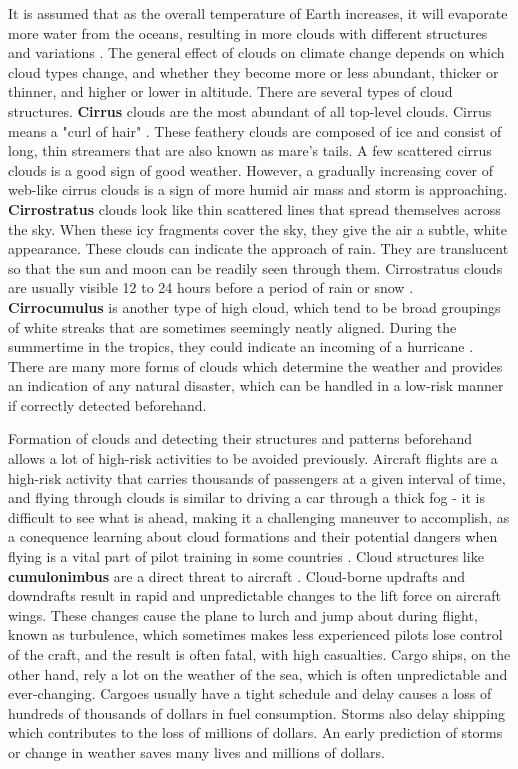 \documentclass[conference]{IEEEtran}
\begin{document}
It is assumed that as the overall temperature of Earth increases, it will evaporate more water from the oceans, resulting in more clouds with different structures and variations \cite{leconte2013increased}. The general effect of clouds on climate change depends on which cloud types change, and whether they become more or less abundant, thicker or thinner, and higher or lower in altitude. There are several types of cloud structures. \textbf{Cirrus} clouds are the most abundant of all top-level clouds. Cirrus means a "curl of hair" \cite{dowling1990summary}. These feathery clouds are composed of ice and consist of long, thin streamers that are also known as mare's tails. A few scattered cirrus clouds is a good sign of good weather. However, a gradually increasing cover of web-like cirrus clouds is a sign of more humid air mass and storm is approaching. \textbf{Cirrostratus} clouds look like thin scattered lines that spread themselves across the sky. When these icy fragments cover the sky, they give the air a subtle, white appearance. These clouds can indicate the approach of rain. They are translucent so that the sun and moon can be readily seen through them. Cirrostratus clouds are usually visible 12 to 24 hours before a period of rain or snow \cite{gadsden1989noctilucent}. \textbf{Cirrocumulus} is another type of high cloud, which tend to be broad groupings of white streaks that are sometimes seemingly neatly aligned. During the summertime in the tropics, they could indicate an incoming of a hurricane \cite{mclean1957cloud}. There are many more forms of clouds which determine the weather and provides an indication of any natural disaster, which can be handled in a low-risk manner if correctly detected beforehand.



Formation of clouds and detecting their structures and patterns beforehand allows a lot of high-risk activities to be avoided previously. Aircraft flights are a high-risk activity that carries thousands of passengers at a given interval of time, and flying through clouds is similar to driving a car through a thick fog - it is difficult to see what is ahead, making it a challenging maneuver to accomplish, as a conequence learning about cloud formations and their potential dangers when flying is a vital part of pilot training in some countries \cite{zhang2011impact}. Cloud structures like \textbf{cumulonimbus} are a direct threat to aircraft \cite{mason2006ice}. Cloud-borne updrafts and downdrafts result in rapid and unpredictable changes to the lift force on aircraft wings. These changes cause the plane to lurch and jump about during flight, known as turbulence, which sometimes makes less experienced pilots lose control of the craft, and the result is often fatal, with high casualties. Cargo ships, on the other hand, rely a lot on the weather of the sea, which is often unpredictable and ever-changing. Cargoes usually have a tight schedule and delay causes a loss of hundreds of thousands of dollars in fuel consumption. Storms also delay shipping which contributes to the loss of millions of dollars. An early prediction of storms or change in weather saves many lives and millions of dollars.
\end{document}
